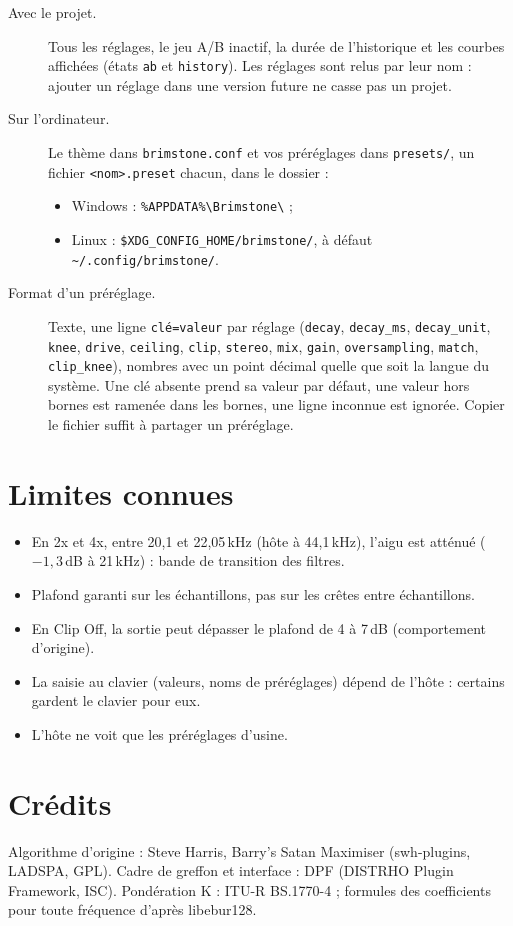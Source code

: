 \documentclass[a4paper,11pt]{article}
\newcommand{\dB}{\,dB}
\begin{document}
\begin{description}
\item[Avec le projet.] Tous les réglages, le jeu A/B inactif, la durée de l'historique et les
  courbes affichées (états \texttt{ab} et \texttt{history}). Les réglages sont relus par leur
  nom : ajouter un réglage dans une version future ne casse pas un projet.
\item[Sur l'ordinateur.] Le thème dans \texttt{brimstone.conf} et vos préréglages dans
  \texttt{presets/}, un fichier \texttt{<nom>.preset} chacun, dans le dossier :
  \begin{itemize}
  \item Windows : \verb|%APPDATA%\Brimstone\| ;
  \item Linux : \verb|$XDG_CONFIG_HOME/brimstone/|, à défaut \verb|~/.config/brimstone/|.
  \end{itemize}
\item[Format d'un préréglage.] Texte, une ligne \texttt{clé=valeur} par réglage (\texttt{decay},
  \texttt{decay\_ms}, \texttt{decay\_unit}, \texttt{knee}, \texttt{drive}, \texttt{ceiling},
  \texttt{clip}, \texttt{stereo}, \texttt{mix}, \texttt{gain}, \texttt{oversampling},
  \texttt{match}, \texttt{clip\_knee}), nombres avec un point décimal quelle que soit la langue du
  système. Une clé absente prend sa valeur par défaut, une valeur hors bornes est ramenée dans les
  bornes, une ligne inconnue est ignorée. Copier le fichier suffit à partager un préréglage.
\end{description}

\section{Limites connues}\label{sec:limites}
\begin{itemize}
\item En 2x et 4x, entre 20,1 et 22,05\,kHz (hôte à 44,1\,kHz), l'aigu est atténué ($-1{,}3$\dB{}
  à 21\,kHz) : bande de transition des filtres.
\item Plafond garanti sur les échantillons, pas sur les crêtes entre échantillons.
\item En Clip Off, la sortie peut dépasser le plafond de 4 à 7\dB{} (comportement d'origine).
\item La saisie au clavier (valeurs, noms de préréglages) dépend de l'hôte : certains gardent le
  clavier pour eux.
\item L'hôte ne voit que les préréglages d'usine.
\end{itemize}

\section{Crédits}
Algorithme d'origine : Steve Harris, \og Barry's Satan Maximiser\fg{} (swh-plugins, LADSPA, GPL).
Cadre de greffon et interface : DPF (DISTRHO Plugin Framework, ISC). Pondération K : ITU-R
BS.1770-4 ; formules des coefficients pour toute fréquence d'après libebur128.
\end{document}
